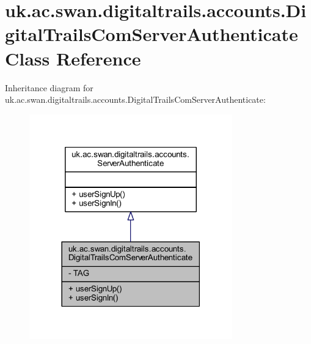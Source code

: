 \hypertarget{classuk_1_1ac_1_1swan_1_1digitaltrails_1_1accounts_1_1_digital_trails_com_server_authenticate}{\section{uk.\+ac.\+swan.\+digitaltrails.\+accounts.\+Digital\+Trails\+Com\+Server\+Authenticate Class Reference}
\label{classuk_1_1ac_1_1swan_1_1digitaltrails_1_1accounts_1_1_digital_trails_com_server_authenticate}
}


Inheritance diagram for uk.\+ac.\+swan.\+digitaltrails.\+accounts.\+Digital\+Trails\+Com\+Server\+Authenticate\+:
\nopagebreak
\begin{figure}[H]
\begin{center}
\leavevmode
\includegraphics[width=249pt]{classuk_1_1ac_1_1swan_1_1digitaltrails_1_1accounts_1_1_digital_trails_com_server_authenticate__inherit__graph}
\end{center}
\end{figure}


